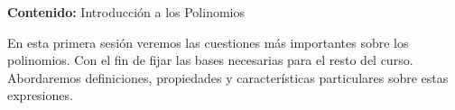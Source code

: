{\Large \textbf{Contenido:} Introducción a los Polinomios}

En esta primera sesión veremos las cuestiones más importantes sobre los polinomios.
Con el fin de fijar las bases necesarias para el resto del curso.
Abordaremos definiciones, propiedades y características particulares sobre estas expresiones.